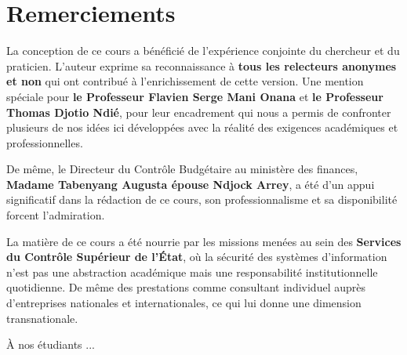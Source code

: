 \documentclass[12pt, a4paper, twoside, openright]{book}
\begin{document}
\clearpage
\thispagestyle{empty}
\chapter*{Remerciements}

La conception de ce cours a bénéficié de l'expérience conjointe du chercheur et du praticien. L'auteur exprime sa reconnaissance à \textbf{tous les relecteurs anonymes et non} qui ont contribué à l'enrichissement de cette version. 
Une mention spéciale pour \textbf{le Professeur Flavien Serge Mani Onana} et \textbf{le Professeur Thomas Djotio Ndié}, pour leur encadrement qui nous a permis de confronter plusieurs de nos idées ici développées avec la réalité des exigences académiques et professionnelles.

De même, le Directeur du Contrôle Budgétaire au ministère des finances, \textbf{Madame Tabenyang Augusta épouse Ndjock Arrey}, a été d'un appui significatif dans la rédaction de ce cours, son professionnalisme et sa disponibilité forcent l'admiration.

La matière de ce cours a été nourrie par les missions menées au sein des \textbf{Services du Contrôle Supérieur de l'État}, où la sécurité des systèmes d'information n'est pas une abstraction académique mais une responsabilité institutionnelle quotidienne. De même des prestations comme consultant individuel auprès d'entreprises nationales et internationales, ce qui lui donne une dimension transnationale.

À nos étudiants ...

\clearpage
\tableofcontents

\clearpage
\listoffigures
{}

\listoftables
{}
\end{document}

